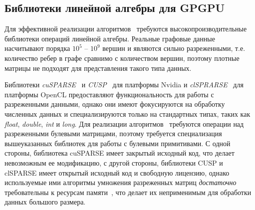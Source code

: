 \subsection{Библиотеки линейной алгебры для GPGPU}

Для эффективной реализации алгоритмов~\cite{inbook:kronecker_cfpq_adbis, inproceedings:matrix_cfpq} требуются высокопроизводительные библиотеки операций линейной алгебры. 
Реальные графовые данные насчитывают порядка $10^5$ -- $10^9$ вершин и являются сильно разреженными, т.е. количество ребер в графе сравнимо с количеством вершин, поэтому плотные матрицы не подходят для представления такого типа данных. 



Библиотеки \textit{cuSPARSE}~\cite{net:cusparse_docs} и \textit{CUSP}~\cite{net:cusplibrary} для платформы Nvidia и \textit{clSPRARSE}~\cite{10.1145/2909437.2909442} для платформы OpenCL предоставляют функциональность для работы с разреженными данными, однако они имеют фокусируются на обработку численных данных и специализируются только на стандартных типах, таких как \textit{float}, \textit{double}, \textit{int} и \textit{long}. Для реализации алгоритмов~\cite{inbook:kronecker_cfpq_adbis, inproceedings:matrix_cfpq} требуются операции над разреженными булевыми матрицами, поэтому требуется специализация вышеуказанных библиотек для работы с булевыми примитивами. С одной стороны, библиотека cuSPARSE имеет закрытый исходный код, что делает невозможным ее модификацию, с другой стороны, библиотеки CUSP и clSPARSE имеет открытый исходный код и свободную лицензию, однако используемые ими алгоритмы умножения разреженных матриц \textit{достаточно} требовательны к ресурсам памяти~\cite{inproceedings:cfqp_matrix_with_single_source}, что делает их неприменимым для обработки данных большого размера.

